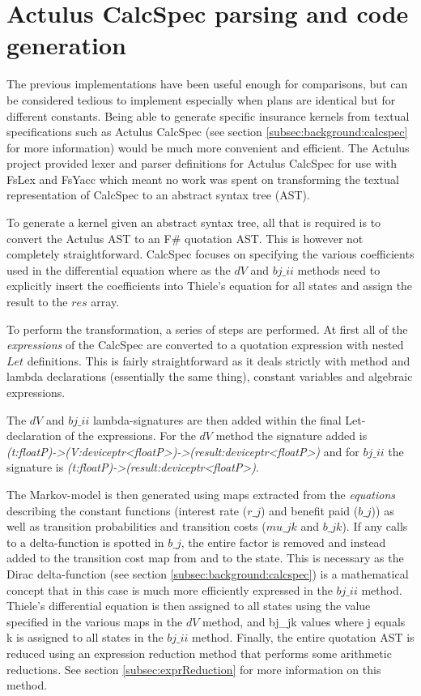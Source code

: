 \section{Actulus CalcSpec parsing and code generation}
The previous implementations have been useful enough for comparisons, but can be considered tedious to implement especially when plans are identical but for different constants.
Being able to generate specific insurance kernels from textual specifications such as Actulus CalcSpec (see section \ref{subsec:background:calcspec} for more information) would be much more convenient and efficient.
The Actulus project provided lexer and parser definitions for Actulus CalcSpec for use with FsLex and FsYacc\cite{fslexfsyacc} which meant no work was spent on transforming the textual representation of CalcSpec to an abstract syntax tree (AST).

To generate a kernel given an abstract syntax tree, all that is required is to convert the Actulus AST to an F\# quotation AST.
This is however not completely straightforward.
CalcSpec focuses on specifying the various coefficients used in the differential equation where as the $dV$ and $bj\_ii$ methods need to explicitly insert the coefficients into Thiele's equation for all states and assign the result to the $res$ array.

To perform the transformation, a series of steps are performed.
At first all of the \emph{expressions} of the CalcSpec are converted to a quotation expression with nested $Let$ definitions.
This is fairly straightforward as it deals strictly with method and lambda declarations (essentially the same thing), constant variables and algebraic expressions.


The $dV$ and $bj\_ii$ lambda-signatures are then added within the final Let-declaration of the expressions.
For the $dV$ method the signature added is \textit{(t:floatP)-\textgreater{}(V:deviceptr\textless{}floatP\textgreater{})-\textgreater{}(result:deviceptr\textless{}floatP\textgreater{})} and for $bj\_ii$ the signature is \textit{(t:floatP)-\textgreater{}(result:deviceptr\textless{}floatP\textgreater{})}.

The Markov-model is then generated using maps extracted from the \emph{equations} describing the constant functions (interest rate ($r\_j$) and benefit paid ($b\_j$)) as well as transition probabilities and transition costs ($mu\_jk$ and $b\_jk$).
If any calls to a delta-function is spotted in $b\_j$, the entire factor is removed and instead added to the transition cost map from and to the state.
This is necessary as the Dirac delta-function (see section \ref{subsec:background:calcspec}) is a mathematical concept that in this case is much more efficiently expressed in the $bj\_ii$ method.
Thiele's differential equation is then assigned to all states using the value specified in the various maps in the $dV$ method, and bj\_jk values where j equals k is assigned to all states in the $bj\_ii$ method.
Finally, the entire quotation AST is reduced using an expression reduction method that performs some arithmetic reductions.
See section \ref{subsec:exprReduction} for more information on this method.

